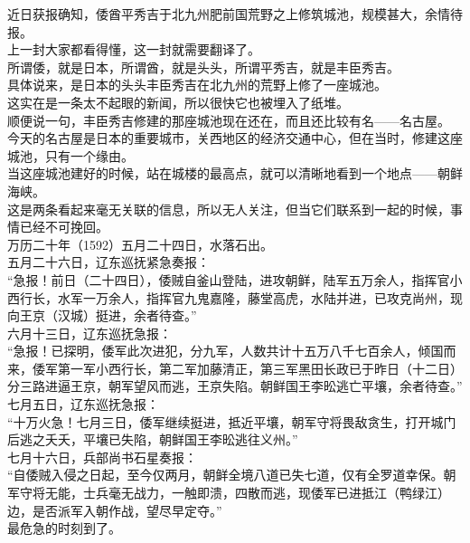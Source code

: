 \begin{multicols}{\theparacolNo}
近日获报确知，倭酋平秀吉于北九州肥前国荒野之上修筑城池，规模甚大，余情待报。\\

上一封大家都看得懂，这一封就需要翻译了。\\

所谓倭，就是日本，所谓酋，就是头头，所谓平秀吉，就是丰臣秀吉。\\

具体说来，是日本的头头丰臣秀吉在北九州的荒野上修了一座城池。\\

这实在是一条太不起眼的新闻，所以很快它也被埋入了纸堆。\\

顺便说一句，丰臣秀吉修建的那座城池现在还在，而且还比较有名——名古屋。\\

今天的名古屋是日本的重要城市，关西地区的经济交通中心，但在当时，修建这座城池，只有一个缘由。\\

当这座城池建好的时候，站在城楼的最高点，就可以清晰地看到一个地点——朝鲜海峡。\\

这是两条看起来毫无关联的信息，所以无人关注，但当它们联系到一起的时候，事情已经不可挽回。\\

万历二十年（1592）五月二十四日，水落石出。\\

五月二十六日，辽东巡抚紧急奏报：\\

“急报！前日（二十四日），倭贼自釜山登陆，进攻朝鲜，陆军五万余人，指挥官小西行长，水军一万余人，指挥官九鬼嘉隆，藤堂高虎，水陆并进，已攻克尚州，现向王京（汉城）挺进，余者待查。”\\

六月十三日，辽东巡抚急报：\\

“急报！已探明，倭军此次进犯，分九军，人数共计十五万八千七百余人，倾国而来，倭军第一军小西行长，第二军加藤清正，第三军黑田长政已于昨日（十二日）分三路进逼王京，朝军望风而逃，王京失陷。朝鲜国王李昖逃亡平壤，余者待查。”\\

七月五日，辽东巡抚急报：\\

“十万火急！七月三日，倭军继续挺进，抵近平壤，朝军守将畏敌贪生，打开城门后逃之夭夭，平壤已失陷，朝鲜国王李昖逃往义州。”\\

七月十六日，兵部尚书石星奏报：\\

“自倭贼入侵之日起，至今仅两月，朝鲜全境八道已失七道，仅有全罗道幸保。朝军守将无能，士兵毫无战力，一触即溃，四散而逃，现倭军已进抵江（鸭绿江）边，是否派军入朝作战，望尽早定夺。”\\

最危急的时刻到了。\\

\ifnum{}
	\end{multicols}
\fi
\newpage

